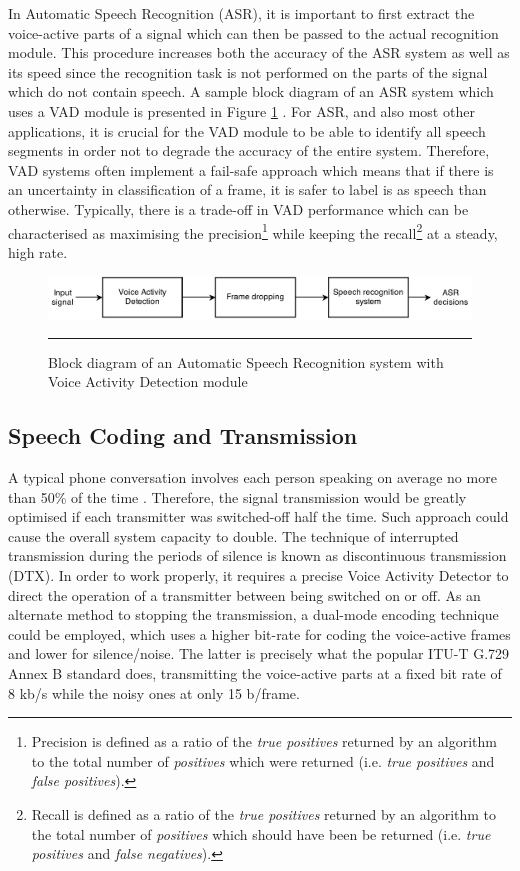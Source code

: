 In Automatic Speech Recognition (ASR), it is important to first extract the voice-active parts of a signal which can then be passed to the actual recognition module. This procedure increases both the accuracy of the ASR system as well as its speed since the recognition task is not performed on the parts of the signal which do not contain speech. A sample block diagram of an ASR system which uses a VAD module is presented in Figure \ref{fig:ASRVAD} \cite{RamirezGorriz}. For ASR, and also most other applications, it is crucial for the VAD module to be able to identify all speech segments in order not to degrade the accuracy of the entire system. Therefore, VAD systems often implement a fail-safe approach which means that if there is an uncertainty in classification of a frame, it is safer to label is as speech than otherwise. Typically, there is a trade-off in VAD performance which can be characterised as maximising the precision\footnote{Precision is defined as a ratio of the \emph{true positives} returned by an algorithm to the total number of \emph{positives} which were returned (i.e. \emph{true positives} and \emph{false positives}).} while keeping the recall\footnote{Recall is defined as a ratio of the \emph{true positives} returned by an algorithm to the total number of \emph{positives} which should have been be returned (i.e. \emph{true positives} and \emph{false negatives}).} at a steady, high rate. \bigskip

\begin{figure}[htbp]
	\centering
		\includegraphics[width=1\columnwidth]{Figures/Chapter1/ASRVAD.png}
		\rule{37em}{0.5pt}
	\caption[Automatic Speech Recognition system with Voice Activity Detection module]{Block diagram of an Automatic Speech Recognition system with Voice Activity Detection module \cite{RamirezGorriz}}
	\label{fig:ASRVAD}
\end{figure}

\subsection{Speech Coding and Transmission}

A typical phone conversation involves each person speaking on average no more than 50\% of the time \citep{GSMControl}. Therefore, the signal transmission would be greatly optimised if each transmitter was switched-off half the time. Such approach could cause the overall system capacity to double. The technique of interrupted transmission during the periods of silence is known as discontinuous transmission (DTX). In order to work properly, it requires a precise Voice Activity Detector to direct the operation of a transmitter between being switched on or off. As an alternate method to stopping the transmission, a dual-mode encoding technique could be employed, which uses a higher bit-rate for coding the voice-active frames and lower for silence/noise. The latter is precisely what the popular ITU-T G.729 Annex B \cite{G729} standard does, transmitting the voice-active parts at a fixed bit rate of 8 kb/s while the noisy ones at only 15 b/frame.


